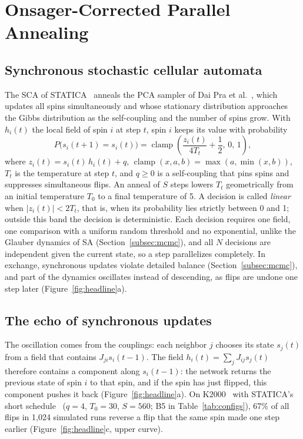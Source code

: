 \section{Onsager-Corrected Parallel Annealing}\label{sec:algorithm}

\subsection{Synchronous stochastic cellular automata}\label{subsec:sca}
The SCA of STATICA~\cite{9062965,yamamoto2021statica} anneals the PCA sampler of Dai Pra et al.~\cite{daipra2012sampling}, which updates all spins simultaneously and whose stationary distribution approaches the Gibbs distribution as the self-coupling and the number of spins grow. With $h_i(t)$ the local field of spin $i$ at step $t$, spin $i$ keeps its value with probability
\begin{equation}
  P\bigl(s_i(t{+}1)=s_i(t)\bigr)=\operatorname{clamp}\!\left(\frac{z_i(t)}{4T_t}+\frac12,\,0,\,1\right),
  \label{eq:sca}
\end{equation}
where $z_i(t)=s_i(t)\,h_i(t)+q$, $\operatorname{clamp}(x,a,b)=\max(a,\min(x,b))$, $T_t$ is the temperature at step $t$, and $q\geq0$ is a self-coupling that pins spins and suppresses simultaneous flips. An anneal of $S$ steps lowers $T_t$ geometrically from an initial temperature $T_0$ to a final temperature of 5. A decision is called \emph{linear} when $|z_i(t)|<2T_t$, that is, when its probability lies strictly between 0 and 1; outside this band the decision is deterministic. Each decision requires one field, one comparison with a uniform random threshold and no \mbox{exponential}, unlike the Glauber dynamics of SA (Section~\ref{subsec:mcmc}), and all $N$ decisions are independent given the current state, so a step parallelizes completely. In exchange, synchronous updates violate detailed balance (Section~\ref{subsec:mcmc}), and part of the dynamics oscillates instead of descending, as flips are undone one step later (Figure~\ref{fig:headline}a).

\subsection{The echo of synchronous updates}\label{subsec:echo}
The oscillation comes from the couplings: each neighbor $j$ chooses its state $s_j(t)$ from a field that contains $J_{ji}s_i(t{-}1)$. The field $h_i(t)=\sum_jJ_{ij}s_j(t)$ therefore contains a component along $s_i(t{-}1)$: the network returns the previous state of spin $i$ to that spin, and if the spin has just flipped, this component pushes it back (Figure~\ref{fig:headline}a). On K2000~\cite{doi:10.1126/science.aah4243} with STATICA's short schedule~\cite{yamamoto2021statica} ($q=4$, $T_0=30$, $S=560$; B5 in Table~\ref{tab:configs}), 67\% of all flips in 1{,}024 simulated runs reverse a flip that the same spin made one step earlier (Figure~\ref{fig:headline}c, upper curve).

